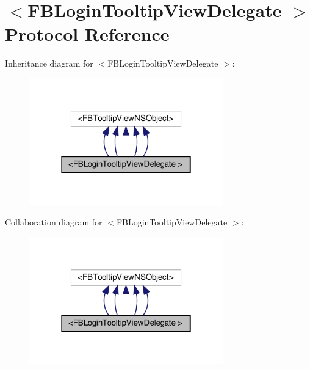 \hypertarget{protocolFBLoginTooltipViewDelegate_01-p}{}\section{$<$F\+B\+Login\+Tooltip\+View\+Delegate $>$ Protocol Reference}
\label{protocolFBLoginTooltipViewDelegate_01-p}


Inheritance diagram for $<$F\+B\+Login\+Tooltip\+View\+Delegate $>$\+:
\nopagebreak
\begin{figure}[H]
\begin{center}
\leavevmode
\includegraphics[width=238pt]{protocolFBLoginTooltipViewDelegate_01-p__inherit__graph}
\end{center}
\end{figure}


Collaboration diagram for $<$F\+B\+Login\+Tooltip\+View\+Delegate $>$\+:
\nopagebreak
\begin{figure}[H]
\begin{center}
\leavevmode
\includegraphics[width=238pt]{protocolFBLoginTooltipViewDelegate_01-p__coll__graph}
\end{center}
\end{figure}
